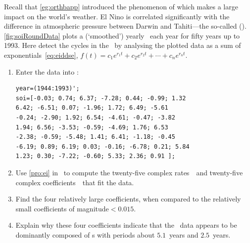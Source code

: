 \begin{exercise} \label{ex:} 
Recall that \autoref{eg:orthbapp} introduced the phenomenon of  which makes a large impact on the world's weather.
El Nino is correlated significantly with the difference in atmospheric pressure between Darwin and Tahiti---the so-called  (\soi).
\autoref{fig:soiRoundData} plots a (`smoothed') yearly  \soi\ each year for fifty years up to 1993.
Here detect the cycles in the \soi\ by analysing the plotted data as a sum of exponentials~\eqref{eq:eiddse}, \(f(t)=c_1e^{r_1t}+c_2e^{r_2t}+\cdots+c_ne^{r_nt}\).
\begin{enumerate}
\item Enter the data into \script:
\setbox\ajrqrbox\hbox{}\marginpar{\usebox{\ajrqrbox}}%
\begin{verbatim}
year=(1944:1993)';
soi=[-0.03; 0.74; 6.37; -7.28; 0.44; -0.99; 1.32
6.42; -6.51; 0.07; -1.96; 1.72; 6.49; -5.61
-0.24; -2.90; 1.92; 6.54; -4.61; -0.47; -3.82
1.94; 6.56; -3.53; -0.59; -4.69; 1.76; 6.53
-2.38; -0.59; -5.48; 1.41; 6.41; -1.18; -0.45
-6.19; 0.89; 6.19; 0.03; -0.16; -6.78; 0.21; 5.84
1.23; 0.30; -7.22; -0.60; 5.33; 2.36; 0.91 ];
\end{verbatim}

\item Use \autoref{pro:ei} in \script\ to compute the twenty-five complex rates~\rv\ and twenty-five complex coefficients~\cv\ that fit the data.

\item Find the four relatively large coefficients, when compared to the relatively small coefficients of magnitude\({}<0.015\).

\item Explain why these four coefficients indicate that the \soi\ data appears to be dominantly composed of s with periods about \(5.1\)~years and \(2.5\)~years.

\end{enumerate}
\end{exercise}
